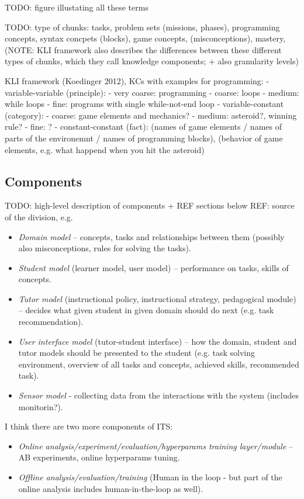 TODO: figure illustating all these terms

TODO: type of chunks: tasks, problem sets (missions, phases), programming concepts,
  syntax concpets (blocks), game concepts, (misconceptions), mastery,
  (NOTE: KLI framework also describes the differences between these different types
  of chunks, which they call knowledge components; + also granularity levels)

KLI framework (Koedinger 2012), KCs with examples for programming:
- variable-variable (principle):
  - very coarse: programming
  - coarse: loops
  - medium: while loops
  - fine: programs with single while-not-end loop
- variable-constant (category):
  - coarse: game elements and mechanics?
  - medium: asteroid?, winning rule?
  - fine: ?
- constant-constant (fact):
  (names of game elements / names of parts of the environemnt / names of programming blocks),
  (behavior of game elements, e.g. what happend when you hit the asteroid)

\subsection{Components}

TODO: high-level description of components + REF sections below
REF: source of the division, e.g. \cite{its-learner-models}

\begin{itemize}
\item \emph{Domain model} -- concepts, tasks and relationships between them
    (possibly also misconceptions, rules for solving the tasks).
\item \emph{Student model} (learner model, user model) -- performance on tasks, skills of concepts.
\item \emph{Tutor model} (instructional policy, instructional strategy, pedagogical module) --
  decides what given student in given domain should do next (e.g. task recommendation).
\item \emph{User interface model} (tutor-student interface) -- how the domain, student and tutor models should be presented to the student (e.g. task solving environment, overview of all tasks and concepts, achieved skills, recommended task).
\item \emph{Sensor model} - collecting data from the interactions with the system
  (includes monitorin?).
\end{itemize}

I think there are two more components of ITS:
\begin{itemize}
\item \emph{Online analysis/experiment/evaluation/hyperparams training layer/module} -- AB experiments, online hyperparams tuning.
\item \emph{Offline analysis/evaluation/training} (Human in the loop - but part
  of the online analysis includes human-in-the-loop as well).
\end{itemize}

